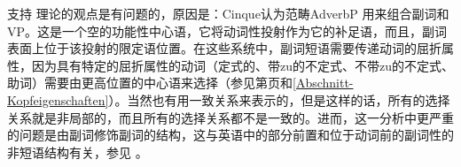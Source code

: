 支持 \citet{Cinque99a-u}理论的观点是有问题的，原因是：Cinque认为范畴AdverbP
用来组合副词和VP。这是一个空的功能性中心语，它将动词性投射作为它的补足语，而且，副词表面上位于该投射的限定语位置。在这些系统中，副词短语需要传递动词的屈折属性，因为具有特定的屈折属性的动词（定式的、带zu的不定式、不带zu的不定式、助词）需要由更高位置的中心语来选择（参见第\pageref{Beispiel-GPSG-Kopfeigenschaften}页和\ref{Abschnitt-Kopfeigenschaften}）。当然也有用一致关系来表示的，但是这样的话，所有的选择关系就是非局部的，而且所有的选择关系都不是一致的。进而，这一分析中更严重的问题是由副词修饰副词的结构，这与英语中的部分前置和位于动词前的副词性的非短语结构有关，参见 。

